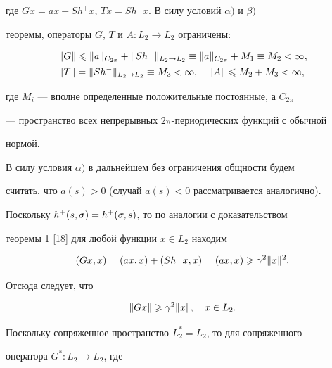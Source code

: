 где $Gx = ax + Sh^+x$, $Tx = Sh^-x$. В силу условий $\alpha)$ и $\beta)$


теоремы, операторы $G$, $T$ и $A:L_2\to L_2$ ограничены:


\begin{equation}


\begin{split}


&\|G\|\lea \|a\|_{C_{2\pi}}+\|Sh^+\|_{L_2\to L_2} \equiv \|a\|_{C_{2\pi}} +


M_1 \equiv  M_2 < \infty, \\


&\|T\|=\|Sh^-\|_{L_2\to L_2} \equiv M_3 < \infty,\quad \|A\|\lea M_2+M_3


<\infty,


\end{split}


\end{equation}


где $M_i$ --- вполне определенные положительные постоянные, а $C_{2\pi}$


--- пространство всех непрерывных $2\pi$-периодических функций с обычной


нормой.





В силу условия $\alpha)$ в дальнейшем без ограничения общности будем


считать, что $a(s)>0$ (случай $a(s)<0$ рассматривается аналогично).


Поскольку $h^+(s,\sigma) = h^+(\sigma,s)$, то по аналогии с доказательством


теоремы 1 [18] для любой функции $x\in L_2$ находим


\begin{equation}


(Gx,x) = (ax,x) + (Sh^+x,x) = (ax,x)\gea \gamma^2\|x\|^2.


\end{equation}


Отсюда следует, что


\begin{equation}


\|Gx\|\gea \gamma^2\|x\|,\quad x\in L_2.


\end{equation}


Поскольку сопряженное пространство $L_2^* = L_2$, то для сопряженного


оператора $G^*:L_2\to L_2$, где


